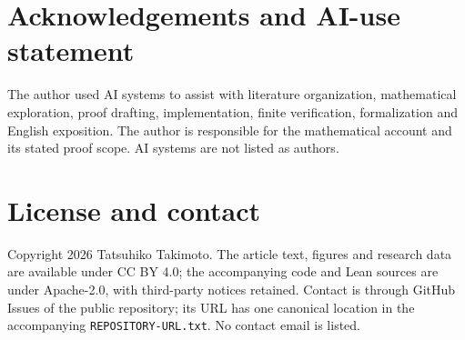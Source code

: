 \documentclass[11pt]{amsart}
\newcommand{\record}[1]{\nolinkurl{#1}}
\theoremstyle{definition}\newtheorem{definition}{Definition}
\begin{document}
\section*{Acknowledgements and AI-use statement}
The author used AI systems to assist with literature
organization, mathematical exploration, proof drafting, implementation,
finite verification, formalization and English exposition. The author
is responsible for the mathematical account and its stated proof
scope. AI systems are not listed as authors.

\section*{License and contact}
Copyright 2026 Tatsuhiko Takimoto. The article text, figures and research
data are available under CC BY 4.0; the accompanying code and Lean
sources are under Apache-2.0, with third-party notices retained.
Contact is through GitHub Issues of the public repository; its URL
has one canonical location in the accompanying
\record{REPOSITORY-URL.txt}. No contact email is listed.
\end{document}
